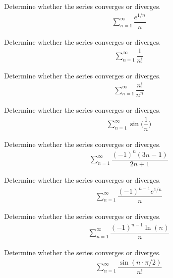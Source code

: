 \begin{exercise}
Determine whether the series converges or diverges.
\begin{align*}
    \sum_{n=1}^{\infty} \dfrac{e^{1/n}}{n}
\end{align*}
\end{exercise}

\begin{exercise}
Determine whether the series converges or diverges.
\begin{align*}
    \sum_{n=1}^{\infty} \dfrac{1}{n!}
\end{align*}
\end{exercise}

\begin{exercise}
Determine whether the series converges or diverges.
\begin{align*}
    \sum_{n=1}^{\infty} \dfrac{n!}{n^{n}}
\end{align*}
\end{exercise}

\begin{exercise}
Determine whether the series converges or diverges.
\begin{align*}
    \sum_{n=1}^{\infty} \sin\Big(\dfrac{1}{n}\Big)
\end{align*}
\end{exercise}

\begin{exercise}
Determine whether the series converges or diverges.
\begin{align*}
    \sum_{n=1}^{\infty} \dfrac{(-1)^{n}(3n-1)}{2n+1}
\end{align*}
\end{exercise}

\begin{exercise}
Determine whether the series converges or diverges.
\begin{align*}
    \sum_{n=1}^{\infty} \dfrac{(-1)^{n-1}e^{1/n}}{n}
\end{align*}
\end{exercise}

\begin{exercise}
Determine whether the series converges or diverges.
\begin{align*}
    \sum_{n=1}^{\infty} \dfrac{(-1)^{n-1}\ln(n)}{n}
\end{align*}
\end{exercise}

\begin{exercise}
Determine whether the series converges or diverges.
\begin{align*}
    \sum_{n=1}^{\infty} \dfrac{\sin(n \cdot \pi/2)}{n!}
\end{align*}
\end{exercise}

